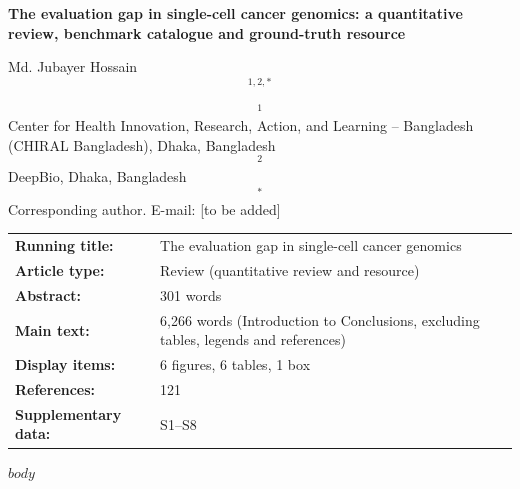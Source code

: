 \documentclass[11pt]{article}
\begin{document}
\begin{titlepage}
\nolinenumbers\noindent
{\LARGE\bfseries The evaluation gap in single-cell cancer genomics: a quantitative review, benchmark catalogue and ground-truth resource\par}
\vspace{1.5em}\noindent
{\large Md. Jubayer Hossain$$^{1,2,*}$$\par}
\vspace{0.8em}\noindent
{\small $$^{1}$$Center for Health Innovation, Research, Action, and Learning -- Bangladesh (CHIRAL Bangladesh), Dhaka, Bangladesh\\
$$^{2}$$DeepBio, Dhaka, Bangladesh\\[0.4em]
$$^{*}$$Corresponding author. E-mail: [to be added]\par}
\vspace{1.5em}
\noindent\begin{tabular}{@{}lp{}@{}}
\textbf{Running title:} & The evaluation gap in single-cell cancer genomics\\
\textbf{Article type:} & Review (quantitative review and resource)\\
\textbf{Abstract:} & 301 words\\
\textbf{Main text:} & 6,266 words (Introduction to Conclusions, excluding tables, legends and references)\\
\textbf{Display items:} & 6 figures, 6 tables, 1 box\\
\textbf{References:} & 121\\
\textbf{Supplementary data:} & S1--S8\\
\end{tabular}
\end{titlepage}
$body$
\end{document}

